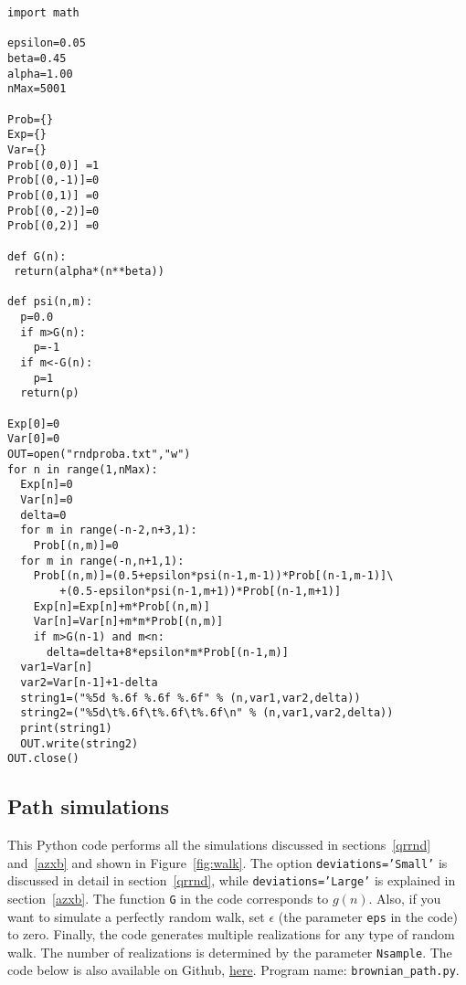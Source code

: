 \documentclass[oneside,10pt]{book}
\begin{document}

\begin{lstlisting}
import math

epsilon=0.05
beta=0.45
alpha=1.00
nMax=5001

Prob={}
Exp={}
Var={}
Prob[(0,0)] =1
Prob[(0,-1)]=0
Prob[(0,1)] =0
Prob[(0,-2)]=0
Prob[(0,2)] =0

def G(n):
 return(alpha*(n**beta))

def psi(n,m):
  p=0.0
  if m>G(n):
    p=-1
  if m<-G(n):
    p=1
  return(p)

Exp[0]=0
Var[0]=0
OUT=open("rndproba.txt","w")
for n in range(1,nMax):
  Exp[n]=0
  Var[n]=0
  delta=0
  for m in range(-n-2,n+3,1):
    Prob[(n,m)]=0
  for m in range(-n,n+1,1):
    Prob[(n,m)]=(0.5+epsilon*psi(n-1,m-1))*Prob[(n-1,m-1)]\
        +(0.5-epsilon*psi(n-1,m+1))*Prob[(n-1,m+1)]
    Exp[n]=Exp[n]+m*Prob[(n,m)]
    Var[n]=Var[n]+m*m*Prob[(n,m)]
    if m>G(n-1) and m<n:
      delta=delta+8*epsilon*m*Prob[(n-1,m)]
  var1=Var[n]
  var2=Var[n-1]+1-delta
  string1=("%5d %.6f %.6f %.6f" % (n,var1,var2,delta))
  string2=("%5d\t%.6f\t%.6f\t%.6f\n" % (n,var1,var2,delta))
  print(string1)
  OUT.write(string2)
OUT.close()
\end{lstlisting}


\subsection{Path simulations}\label{paths}

This Python code performs all the simulations discussed in sections~\ref{qrrnd} and~\ref{azxb} and shown in Figure~\ref{fig:walk}. The option
 \texttt{deviations='Small'} is discussed in detail in section~\ref{qrrnd}, while \texttt{deviations='Large'} is
 explained in section~\ref{azxb}. The function \texttt{G} in the code corresponds to $g(n)$. Also, if you want to simulate a perfectly random walk, set $\epsilon$ (the parameter \texttt{eps} in the code) to zero. Finally, the code generates multiple realizations for any type of random walk. The number of realizations is determined by the parameter \texttt{Nsample}.
The code below is also available on Github, \href{https://github.com/VincentGranville/Machine-Learning/blob/main/Source\%20Code/brownian_path.py}{here}.
Program name: \texttt{brownian\_path.py}. \\
\end{document}
